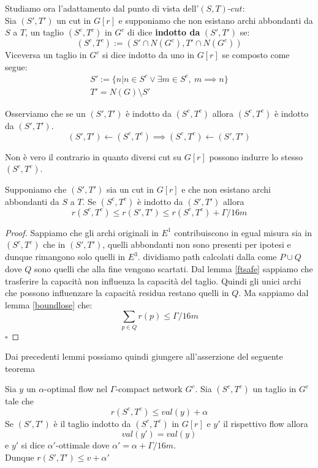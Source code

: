 \documentclass[a4paper, 11pt]{report}
\newcommand*{\QED}{\null\nobreak\hfill\ensuremath{\square}}%
\newcommand{\gmm}{$\Gamma$}
\begin{document}
Studiamo ora l'adattamento dal punto di vista dell'$(S,T)$-$cut$:\\
Sia $(S',T')$ un cut in $G[r]$ e supponiamo che non esistano archi abbondanti da $S$ a $T$,
un taglio $(S^c,T^c)$ in $G^c$ di dice \textbf{indotto da}  $(S',T')$ se: \[(S^c, T^c) := (S'\cap N(G^c), T'\cap N(G^c))\]
Viceversa un taglio in $G^c$ si dice indotto da uno in $G[r]$ se composto come segue:
\[\begin{array}{l}
    S':=\{n | n\in S^c\lor \exists m \in S^c,\ m \implies n\}\\
    T' = N(G)\setminus S'
\end{array}\]

\begin{obs}{}{}
    Osserviamo che se un $(S',T')$ è indotto da  $(S^c,T^c)$ allora  $(S^c,T^c)$ è indotto da $(S',T')$.
        \[(S',T')\leftarrow(S^c,T^c)\implies (S^c,T^c)\leftarrow(S',T')\]

    Non è vero il contrario in quanto diversi cut su $G[r]$ possono indurre lo stesso $(S^c,T^c)$.
\end{obs}

\begin{lemma}{}{}
    Supponiamo che $(S',T')$ sia un cut in $G[r]$ e che non esistano archi abbondanti da $S$ a $T$.
    Se $(S^c,T^c)$ è indotto da $(S',T')$ allora \[ r(S^c,T^c) \le r(S',T')\le r(S^c,T^c)+\Gamma/16m\]
\end{lemma}
\begin{proof}
    Sappiamo che gli archi originali in $E^1$ contribuiscono in egual misura sia in $(S^c,T^c)$ che in $(S',T')$, quelli abbondanti non sono presenti per ipotesi e dunque rimangono solo quelli in $E^3$.
    dividiamo path calcolati dalla  come $P\cup Q$ dove $Q$ sono quelli che alla fine vengono scartati.
    Dal lemma \ref{ftsafe} sappiamo che trasferire la capacità non influenza la capacità del taglio. Quindi gli unici archi che possono influenzare la capacità residua restano quelli in $Q$.
    Ma sappiamo dal lemma \ref{boundlose} che:
    \[\sum_{p\in Q}r(p)\le \Gamma/16m\]\QED
\end{proof}


Dai precedenti lemmi possiamo quindi giungere all'asserzione del seguente teorema
\begin{theo}{}{}
    Sia $y$ un $\alpha$-optimal flow nel \gmm-compact network $G^c$.
    Sia $(S^c,T^c)$ un taglio in $G^c$ tale che \[r(S^c,T^c)\le val(y)+\alpha\] 
    Se $(S',T')$ è il taglio indotto da $(S^c,T^c)$ in $G[r]$ e $y'$ il rispettivo flow allora
    \[val(y') = val(y)\]
    e $y'$ si dice $\alpha'$-ottimale dove $\alpha' = \alpha + \Gamma/16m$.\\
    Dunque $r(S',T') \le v+\alpha'$
\end{theo}
\end{document}

